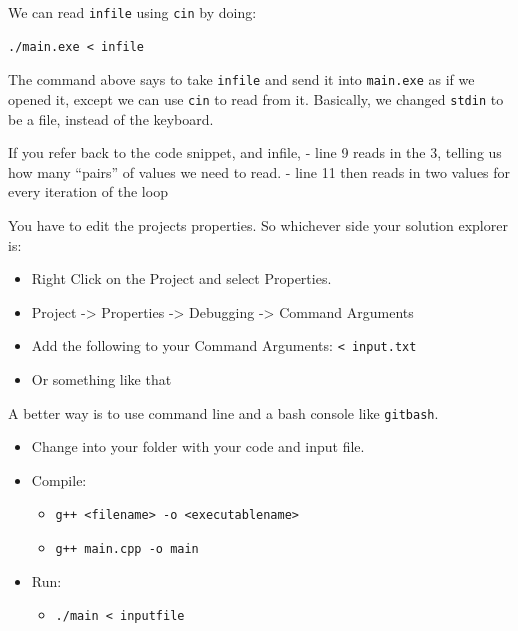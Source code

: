 We can read \texttt{infile} using \texttt{cin} by doing:

\begin{verbatim}
./main.exe < infile 
\end{verbatim}

The command above says to take \texttt{infile} and send it into
\texttt{main.exe} as if we opened it, except we can use \texttt{cin} to
read from it. Basically, we changed \texttt{stdin} to be a file, instead
of the keyboard.

If you refer back to the code snippet, and infile, - line 9 reads in the
3, telling us how many ``pairs'' of values we need to read. - line 11
then reads in two values for every iteration of the loop

\hypertarget{run-in-visual-studio}{%
\label{run-in-visual-studio}}

You have to edit the projects properties. So whichever side your
solution explorer is:

\begin{itemize}
\tightlist
\item
  Right Click on the Project and select Properties.
\item
  Project -\textgreater{} Properties -\textgreater{} Debugging
  -\textgreater{} Command Arguments
\item
  Add the following to your Command Arguments:
  \texttt{\textless{}\ input.txt}
\item
  Or something like that
\end{itemize}

\hypertarget{run-in-terminal}{%
\label{run-in-terminal}}

A better way is to use command line and a bash console like
\texttt{gitbash}.

\begin{itemize}
\tightlist
\item
  Change into your folder with your code and input file.
\item
  Compile:

  \begin{itemize}
  \tightlist
  \item
    \texttt{g++\ \textless{}filename\textgreater{}\ -o\ \textless{}executablename\textgreater{}}
  \item
    \texttt{g++\ main.cpp\ -o\ main}
  \end{itemize}
\item
  Run:

  \begin{itemize}
  \tightlist
  \item
    \texttt{./main\ \textless{}\ inputfile}
  \end{itemize}
\end{itemize}

